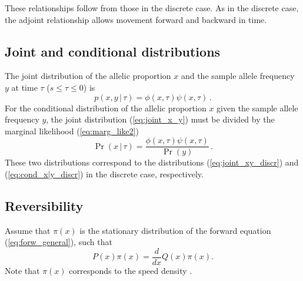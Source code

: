\documentclass[preprint]{elsarticle}
\newcommand\given{{\,|\,}}
\begin{document}
These relationships follow from those in the discrete case. As in the discrete case, the adjoint relationship allows movement forward and backward in time. 

\subsection{Joint and conditional distributions}

The joint distribution of the allelic proportion $x$ and the sample allele frequency $y$ at time $\tau$ ($s \le \tau \le 0$) is
\begin{equation}\label{eq:joint_x_y}
p(x,y \given \tau)= \phi(x, \tau)\psi(x,\tau)\,.
\end{equation}
For the conditional distribution of the allelic proportion $x$ given the sample allele frequency $y$, the joint distribution (\ref{eq:joint_x_y}) must be divided by the marginal likelihood (\ref{eq:marg_like2})
\begin{equation}\label{eq:cond_x|y}
\Pr(x\given \tau)= \frac{\phi(x, \tau)\psi(x,\tau)}{\Pr(y)}\,.
\end{equation}
These two distributions correspond to the distributions (\ref{eq:joint_xy_discr}) and (\ref{eq:cond_x|y_discr}) in the discrete case, respectively. 

\subsection{Reversibility}

Assume that $\pi(x)$ is the stationary distribution of the forward equation (\ref{eq:forw_general}), such that 
\begin{equation}
P(x)\pi(x)=\frac{d}{d x}Q(x)\pi(x).
\end{equation}
Note that $\pi(x)$ corresponds to the speed density \citep{Ewen04,Song12}. 
\end{document}
